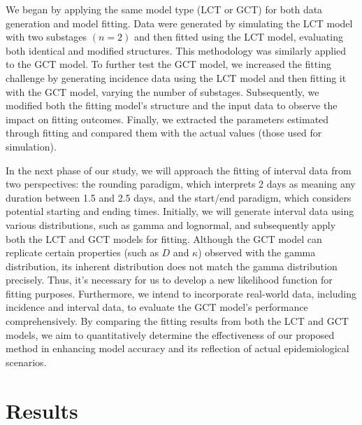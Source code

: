 \documentclass[12pt]{article}
\begin{document}
We began by applying the same model type (LCT or GCT) for both data generation and model fitting. Data were generated by simulating the LCT model with two substages $(n=2)$ and then fitted using the LCT model, evaluating both identical and modified structures. This methodology was similarly applied to the GCT model. To further test the GCT model, we increased the fitting challenge by generating incidence data using the LCT model and then fitting it with the GCT model, varying the number of substages. Subsequently, we modified both the fitting model's structure and the input data to observe the impact on fitting outcomes. Finally, we extracted the parameters estimated through fitting and compared them with the actual values (those used for simulation).

In the next phase of our study, we will approach the fitting of interval data from two perspectives: the rounding paradigm, which interprets 2 days as meaning any duration between 1.5 and 2.5 days, and the start/end paradigm, which considers potential starting and ending times. Initially, we will generate interval data using various distributions, such as gamma and lognormal, and subsequently apply both the LCT and GCT models for fitting. Although the GCT model can replicate certain properties (such as $D$ and $\kappa$) observed with the gamma distribution, its inherent distribution does not match the gamma distribution precisely. Thus, it's necessary for us to develop a new likelihood function for fitting purposes. Furthermore, we intend to incorporate real-world data, including incidence and interval data, to evaluate the GCT model's performance comprehensively. By comparing the fitting results from both the LCT and GCT models, we aim to quantitatively determine the effectiveness of our proposed method in enhancing model accuracy and its reflection of actual epidemiological scenarios.

\section{Results}
\end{document}
